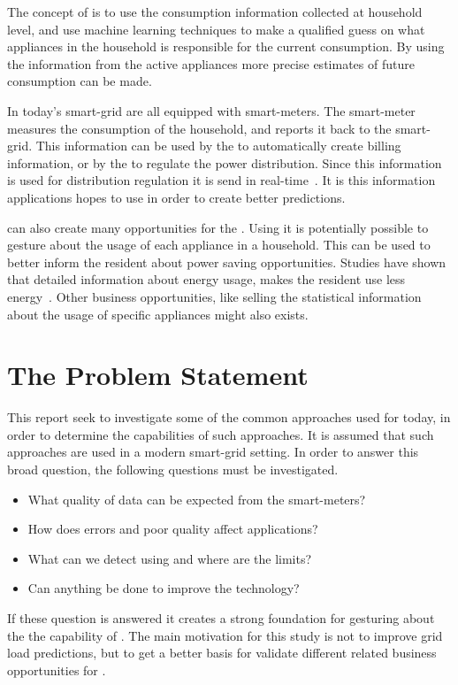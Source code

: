 The concept of  is to use the consumption information collected at household level, and use machine learning techniques to make a qualified guess on what appliances in the household is responsible for the current consumption. By using the information from the active appliances more precise estimates of future consumption can be made. 

In today's smart-grid are all  equipped with smart-meters. The smart-meter measures the consumption of the household, and reports it back to the smart-grid. This information can be used by the  to automatically create billing information, or by the  to regulate the power distribution. Since this information is used for distribution regulation it is send in real-time~\citep{RefWorks:41}. It is this information  applications hopes to use in order to create better predictions.

 can also create many opportunities for the . Using  it is potentially possible to gesture about the usage of each appliance in a household. This can be used to better inform the resident about power saving opportunities. Studies have shown that detailed information about energy usage, makes the resident use less energy~\citep{RefWorks:33}. Other business opportunities, like selling the statistical information about the usage of specific appliances might also exists.  

\section{The Problem Statement}

This report seek to investigate some of the common approaches used for  today, in order to determine the capabilities of such approaches. It is assumed that such approaches are used in a modern smart-grid setting. In order to answer this broad question, the following questions must be investigated. 

\begin{itemize}
\item	What quality of data can be expected from the smart-meters?\\
	
\item	How does errors and poor quality affect  applications?\\
	
\item	What can we detect using   and where are the limits? \\
	
\item	Can anything be done to improve the  technology?
\end{itemize}
If these question is answered it creates a strong foundation for gesturing about the the capability of . The main motivation for this study is not to improve grid load predictions, but to get a better basis for validate different  related business opportunities for . 

